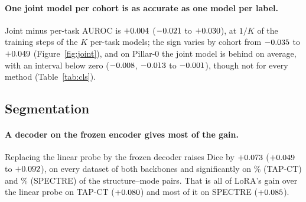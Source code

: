 \paragraph{One joint model per cohort is as accurate as one model per label.} Joint minus per-task AUROC is $+0.004$ ($-0.021$ to $+0.030$), at $1/K$ of the training steps of the $K$ per-task models; the sign varies by cohort from $-0.035$ to $+0.049$ (Figure~\ref{fig:joint}), and on Pillar-0 the joint model is behind on average, with an interval below zero ($-0.008$, $-0.013$ to $-0.001$), though not for every method (Table~\ref{tab:cls}).

\subsection{Segmentation}
\label{sec:seg}

\paragraph{A decoder on the frozen encoder gives most of the gain.} Replacing the linear probe by the frozen decoder raises Dice by $+0.073$ ($+0.049$ to $+0.092$), on every dataset of both backbones and significantly on \numSegpairedTapctLinDecSigbetter\% (TAP-CT) and \numSegpairedSpectreLinDecSigbetter\% (SPECTRE) of the structure--mode pairs. That is all of LoRA's gain over the linear probe on TAP-CT ($+0.080$) and most of it on SPECTRE ($+0.085$).

